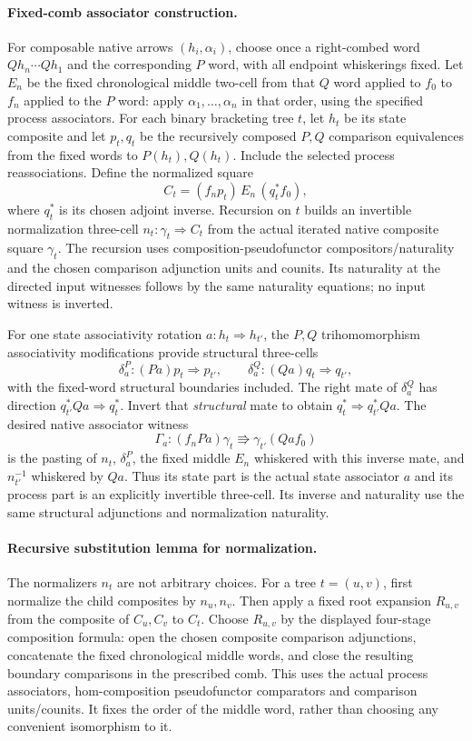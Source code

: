 \documentclass{article}
\begin{document}
\paragraph{Fixed-comb associator construction.} For composable native arrows $(h_i,\alpha_i)$, choose once a right-combed word $Qh_n\cdots Qh_1$ and the corresponding $P$ word, with all endpoint whiskerings fixed. Let $E_n$ be the fixed chronological middle two-cell from that $Q$ word applied to $f_0$ to $f_n$ applied to the $P$ word: apply $\alpha_1,\ldots,\alpha_n$ in that order, using the specified process associators. For each binary bracketing tree $t$, let $h_t$ be its state composite and let $p_t,q_t$ be the recursively composed $P,Q$ comparison equivalences from the fixed words to $P(h_t),Q(h_t)$. Include the selected process reassociations. Define the normalized square
\[
 C_t=(f_n p_t)\,E_n\,(q_t^* f_0),
\]
where $q_t^*$ is its chosen adjoint inverse. Recursion on $t$ builds an invertible normalization three-cell $n_t:\gamma_t\Rightarrow C_t$ from the actual iterated native composite square $\gamma_t$. The recursion uses composition-pseudofunctor compositors/naturality and the chosen comparison adjunction units and counits. Its naturality at the directed input witnesses follows by the same naturality equations; no input witness is inverted.

For one state associativity rotation $a:h_t\Rightarrow h_{t'}$, the $P,Q$ trihomomorphism associativity modifications provide structural three-cells
\[
 \delta^P_a:(Pa)p_t\Rightarrow p_{t'},\qquad
 \delta^Q_a:(Qa)q_t\Rightarrow q_{t'},
\]
with the fixed-word structural boundaries included. The right mate of $\delta^Q_a$ has direction $q_{t'}^*Qa\Rightarrow q_t^*$. Invert that \emph{structural} mate to obtain $q_t^*\Rightarrow q_{t'}^*Qa$. The desired native associator witness
\[
 \Gamma_a:(f_nPa)\gamma_t\Rrightarrow\gamma_{t'}(Qa f_0)
\]
is the pasting of $n_t$, $\delta^P_a$, the fixed middle $E_n$ whiskered with this inverse mate, and $n_{t'}^{-1}$ whiskered by $Qa$. Thus its state part is the actual state associator $a$ and its process part is an explicitly invertible three-cell. Its inverse and naturality use the same structural adjunctions and normalization naturality.

\paragraph{Recursive substitution lemma for normalization.} The normalizers $n_t$ are not arbitrary choices. For a tree $t=(u,v)$, first normalize the child composites by $n_u,n_v$. Then apply a fixed root expansion $R_{u,v}$ from the composite of $C_u,C_v$ to $C_t$. Choose $R_{u,v}$ by the displayed four-stage composition formula: open the chosen composite comparison adjunctions, concatenate the fixed chronological middle words, and close the resulting boundary comparisons in the prescribed comb. This uses the actual process associators, hom-composition pseudofunctor comparators and comparison units/counits. It fixes the order of the middle word, rather than choosing any convenient isomorphism to it.
\end{document}
